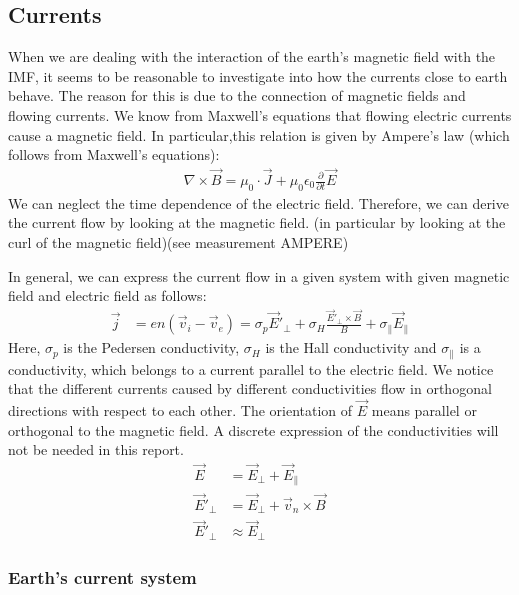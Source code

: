 \documentclass[10pt,a4paper]{article}
\begin{document}
\subsection{Currents \label{_CHAP_THEO_currents}}

When we are dealing with the interaction of the earth's magnetic field with the IMF, it seems to be reasonable to investigate into how the currents close to earth behave. 
The reason for this is due to the connection of magnetic fields and flowing currents. We know from Maxwell's equations that flowing electric currents cause a magnetic field. In particular,this relation is given by Ampere's law (which follows from Maxwell's equations):
\begin{align}
\nabla \times \vec{B}= \mu_0 \cdot \vec{J} + \mu_0 \epsilon_0 \frac{\partial }{\partial t} \vec{E}
\end{align}
We can neglect the time dependence of the electric field.  
Therefore, we can derive the current flow by looking at the magnetic field. (in particular by looking at the curl of the magnetic field)(see measurement AMPERE)

In general, we can express the current flow in a given system with given magnetic field and electric field as follows:
\begin{align}
\vec{j}&= e n ( \vec{v}_i - \vec{v}_e ) = \sigma_p \vec{E}'_{\perp} + \sigma_H \frac{\vec{E}'_{\perp} \times \vec{B}}{B} + \sigma_{\parallel} \vec{E}_{\parallel}
\end{align}
Here, $\sigma_p$ is the Pedersen conductivity, $\sigma_H$ is the Hall conductivity and $\sigma_{\parallel}$ is a conductivity, which belongs to a current parallel to the electric field. We notice that the different currents caused by different conductivities flow in orthogonal directions with respect to each other. The orientation of $\vec{E}$ means parallel or orthogonal to the magnetic field. A discrete expression of the conductivities will not be needed in this report. 
\begin{align}
\vec{E}&= \vec{E}_{\perp} +\vec{E}_{\parallel}\\
\vec{E}'_{\perp}&=\vec{E}_{\perp}+ \vec{v}_n \times \vec{B}\\
\vec{E}'_{\perp}& \approx \vec{E}_{\perp}
\end{align}

\subsubsection{Earth's current system \label{_CHAP_THEO_currentsystem earth}}
\end{document}
